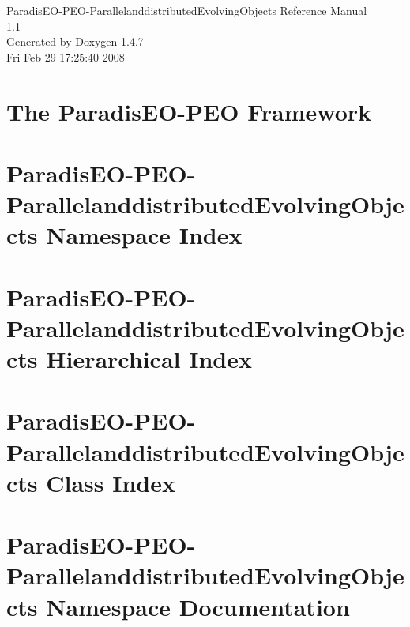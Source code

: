 \documentclass[a4paper]{book}
\begin{document}
\begin{titlepage}
\vspace*{7cm}
\begin{center}
{\Large Paradis\-EO-PEO-Parallelanddistributed\-Evolving\-Objects Reference Manual\\[1ex]\large 1.1 }\\
\vspace*{1cm}
{\large Generated by Doxygen 1.4.7}\\
\vspace*{0.5cm}
{\small Fri Feb 29 17:25:40 2008}\\
\end{center}
\end{titlepage}
\clearemptydoublepage
{}
\tableofcontents
\clearemptydoublepage
{}
\chapter{The Paradis\-EO-PEO Framework }
\label{index}\hypertarget{index}{}
\chapter{Paradis\-EO-PEO-Parallelanddistributed\-Evolving\-Objects Namespace Index}

\chapter{Paradis\-EO-PEO-Parallelanddistributed\-Evolving\-Objects Hierarchical Index}

\chapter{Paradis\-EO-PEO-Parallelanddistributed\-Evolving\-Objects Class Index}

\chapter{Paradis\-EO-PEO-Parallelanddistributed\-Evolving\-Objects Namespace Documentation}

\end{document}
